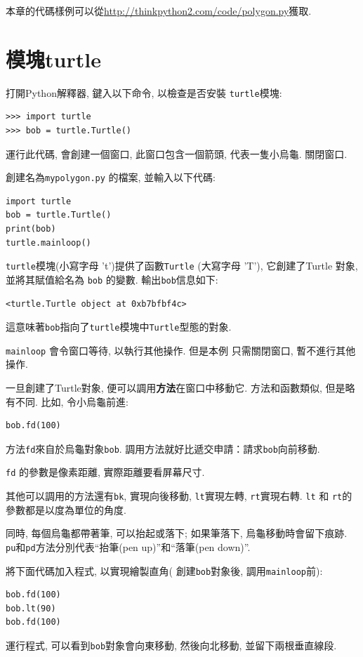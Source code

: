 \documentclass[10pt]{book}
\begin{document}
本章的代碼樣例可以從\url{http://thinkpython2.com/code/polygon.py}獲取. 


\section{模塊turtle}
\label{turtle}

打開Python解釋器, 鍵入以下命令, 以檢查是否安裝 {\tt turtle}模塊:

\begin{verbatim}
>>> import turtle
>>> bob = turtle.Turtle()
\end{verbatim}

運行此代碼, 會創建一個窗口, 此窗口包含一個箭頭, 代表一隻小烏龜. 
關閉窗口. 

創建名為{\tt mypolygon.py} 的檔案, 並輸入以下代碼:

\begin{verbatim}
import turtle
bob = turtle.Turtle()
print(bob)
turtle.mainloop()
\end{verbatim}
%
 {\tt turtle}模塊(小寫字母 't')提供了函數{\tt Turtle} (大寫字母 'T'), 
它創建了Turtle 對象, 並將其賦值給名為 {\tt bob} 的變數. 
輸出{\tt bob}信息如下:

\begin{verbatim}
<turtle.Turtle object at 0xb7bfbf4c>
\end{verbatim}
%
這意味著{\tt bob}指向了{\tt turtle}模塊中{\tt Turtle}型態的對象.

\verb"mainloop" 會令窗口等待, 以執行其他操作. 但是本例
只需關閉窗口, 暫不進行其他操作. 

一旦創建了Turtle對象, 便可以調用{\bf 方法}在窗口中移動它. 
方法和函數類似, 但是略有不同. 比如, 令小烏龜前進:

\begin{verbatim}
bob.fd(100)
\end{verbatim}
%
方法{\tt fd}來自於烏龜對象{\tt bob}. 
調用方法就好比遞交申請：請求{\tt bob}向前移動. 

{\tt fd} 的參數是像素距離, 實際距離要看屏幕尺寸. 

其他可以調用的方法還有{\tt bk}, 實現向後移動, 
{\tt lt}實現左轉, {\tt rt}實現右轉. 
{\tt lt} 和 {\tt rt}的參數都是以度為單位的角度. 

同時, 每個烏龜都帶著筆, 可以抬起或落下;
如果筆落下, 烏龜移動時會留下痕跡. 
{\tt pu}和{\tt pd}方法分別代表``抬筆(pen up)''和``落筆(pen down)''.

將下面代碼加入程式, 以實現繪製直角(
創建{\tt bob}對象後, 調用\verb"mainloop"前):

\begin{verbatim}
bob.fd(100)
bob.lt(90)
bob.fd(100)
\end{verbatim}
%
運行程式, 可以看到{\tt bob}對象會向東移動, 然後向北移動, 並留下兩根垂直線段. 
\end{document}
